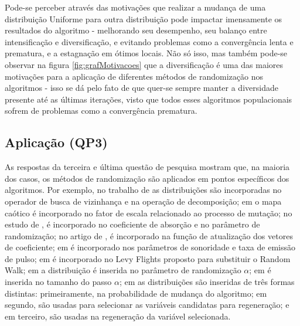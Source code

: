 Pode-se perceber através das motivações que realizar a mudança de uma distribuição Uniforme para outra distribuição pode impactar imensamente os resultados do algoritmo - melhorando seu desempenho, seu balanço entre intensificação e diversificação, e evitando problemas como a convergência lenta e prematura, e a estagnação em ótimos locais. Não só isso, mas também pode-se observar na figura \ref{fig:grafMotivacoes} que a diversificação é uma das maiores motivações para a aplicação de diferentes métodos de randomização nos algoritmos - isso se dá pelo fato de que quer-se sempre manter a diversidade presente até as últimas iterações, visto que todos esses algoritmos populacionais sofrem de problemas como a convergência prematura.


\subsection{Aplicação (QP3)}

As respostas da terceira e última questão de pesquisa mostram que, na maioria dos casos, os métodos de randomização são aplicados em pontos específicos dos algoritmos. Por exemplo, no trabalho de \cite{yu} as distribuições são incorporadas no operador de busca de vizinhança e na operação de decomposição; em \cite{alireza} o mapa caótico é incorporado no fator de escala relacionado ao processo de mutação; no estudo de \cite{coelho}, é incorporado no coeficiente de absorção e no parâmetro de randomização; no artigo de \cite{farshin}, é incorporado na função de atualização dos vetores de coeficiente; em \cite{liang} é incorporado nos parâmetros de sonoridade e taxa de emissão de pulso; em \cite{lin} é incorporado no Levy Flights proposto para substituir o Random Walk; em \cite{coelho2} a distribuição é inserida no parâmetro de randomização $\alpha$; em \cite{wang} é inserida no tamanho do passo $\alpha$; em \cite{kaveh} as distribuições são inseridas de três formas distintas: primeiramente, na probabilidade de mudança do algoritmo; em segundo, são usadas para selecionar as variáveis candidatas para regeneração; e em terceiro, são usadas na regeneração da variável selecionada. 


